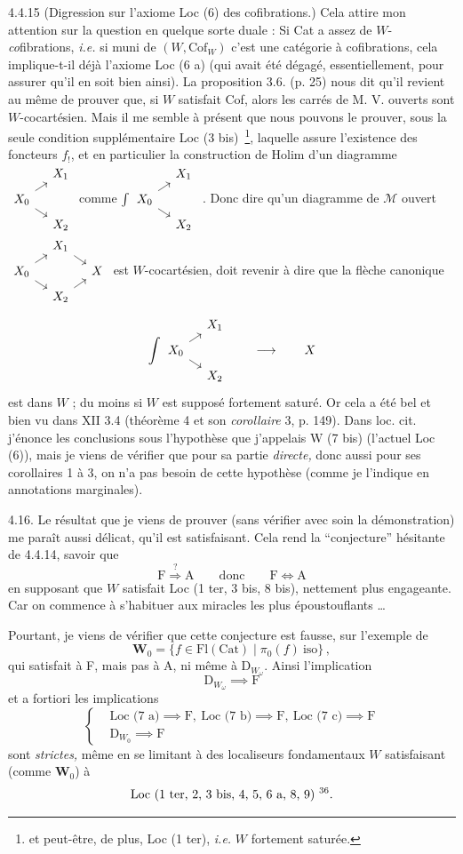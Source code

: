 \documentclass[11pt]{article}
\newcommand{\printedpage}[1]{\marginpar{\footnotesize p.~#1}}
\newcommand{\msp}[1]{\marginpar{\footnotesize [#1]}}
\newcommand{\fourche}{\begin{tikzcd}[ampersand replacement=\&, row sep=0.5em, column sep=1em, baseline=(\tikzcdmatrixname-2-1.base)]\& X_1 \\ X_0 \arrow[ur]\arrow[dr] \& \\ \& X_2\end{tikzcd}}
\newcommand{\carre}{\begin{tikzcd}[ampersand replacement=\&, row sep=0.5em, column sep=1em, baseline=(\tikzcdmatrixname-2-1.base)]\& X_1 \arrow[dr] \& \\ X_0 \arrow[ur]\arrow[dr] \& \& X \\ \& X_2 \arrow[ur] \&\end{tikzcd}}
\begin{document}
4.4.15 (Digression sur l'axiome Loc (6) des cofibrations.) Cela attire mon attention sur la question en quelque sorte duale : Si Cat a assez de $W$-\textit{co}fibrations, \textit{i.e.} si muni de $(W,\mathrm{Cof}_W)$ c'est une catégorie à cofibrations, cela implique-t-il déjà l'axiome Loc (6 a) (qui avait été dégagé, essentiellement, pour assurer qu'il en soit bien ainsi). La proposition 3.6. (p. 25) nous dit qu'il revient au même de prouver que, si $W$ satisfait Cof, alors les carrés de M. V. ouverts sont
\msp{page 67}%
$W$-cocartésien. Mais il me semble à présent que nous pouvons le prouver, sous la seule condition supplémentaire Loc (3 bis)~\footnote[35]{et peut-être, de plus, Loc (1 ter), \textit{i.e.} $W$ fortement saturée.}, laquelle assure l'existence des foncteurs $f_!$, et %
\printedpage{38}%
en particulier la construction de Holim d'un diagramme $\fourche$ \quad comme $\int\fourche$ \quad .
Donc dire qu'un diagramme de $\mathcal{M}$ ouvert $\carre$ est $W$-cocartésien, doit revenir à dire que la flèche canonique
\[
\int\fourche \qquad \longrightarrow \qquad X
\]
est dans $W$ ; du moins si $W$ est supposé fortement saturé. Or cela a été bel et bien vu dans XII 3.4 (théorème 4 et son \textit{corollaire} 3, p. 149). Dans loc. cit. j'énonce les conclusions sous l'hypothèse que j'appelais W (7 bis) (l'actuel Loc (6)), mais je viens de vérifier que pour sa partie \textit{directe,} donc aussi pour ses corollaires 1 à 3, on n'a pas besoin
\msp{page 68}%
de cette hypothèse (comme je l'indique en annotations marginales).

4.16. Le résultat que je viens de prouver (sans vérifier avec soin la démonstration) me paraît aussi délicat, qu'il est satisfaisant. Cela rend la “conjecture” hésitante de 4.4.14, savoir que
\[
\mathrm{F} \overset{?}{\Longrightarrow} \mathrm{A} \qquad \text{donc} \qquad \mathrm{F}\Longleftrightarrow\mathrm{A}
\]
en supposant que $W$ satisfait Loc (1 ter, 3 bis, 8 bis), nettement plus engageante. Car on commence à s'habituer aux miracles les plus époustouflants \ldots

Pourtant, je viens de vérifier que cette conjecture est fausse, sur l'exemple de
\[
\mathbf{W}_0=\{f\in\mathrm{Fl}(\mathrm{Cat})\mid\pi_0(f)\ \mathrm{iso}\}\,,
\]
qui satisfait à F, mais pas à A, ni même à $\mathrm{D}_{W_\omega}$. Ainsi l'implication
\[
\mathrm{D}_{W_\omega} \implies \mathrm{F}
\]
et a fortiori les implications
\[
\left\{
\begin{aligned}
&\text{Loc (7 a)} \implies \mathrm{F},\ \text{Loc (7 b)} \implies \mathrm{F},\ \text{Loc (7 c)} \implies \mathrm{F}\\
&\mathrm{D}_{W_0} \implies \mathrm{F}
\end{aligned}
\right.
\]
sont \textit{strictes,} même en se limitant à des localiseurs fondamentaux $W$ satisfaisant (comme $\mathbf{W}_0$) à
\[
\text{Loc (1 ter, 2, 3 bis, 4, 5, 6 a, 8, 9)}\ \text{\footnotemark[36]}.
\]
\end{document}
